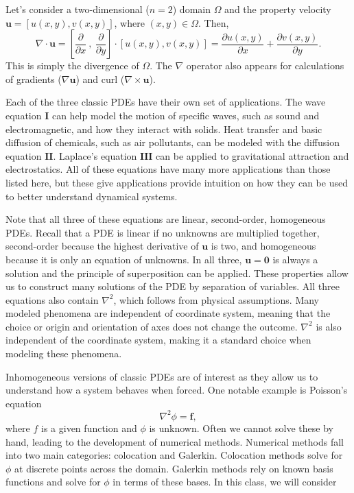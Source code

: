 \noindent Let's consider a two-dimensional ($n = 2$) domain $\Omega$ and the property velocity $\mathbf{u} = \left[u(x,y), v(x,y) \right]$, where $(x,y) \in \Omega$. Then,
$$
\nabla \cdot \mathbf{u}= \left[ 
\frac{\partial }{\partial x} \ , \ \frac{\partial }{\partial y} \right] \cdot  \left[  u(x,y), v(x,y) \right]= 
\frac{\partial u(x,y) }{\partial x} + \frac{\partial v(x,y)}{\partial y}.
$$
This is simply the divergence of $\Omega$. The $\nabla$ operator also appears for calculations of gradients ($\nabla \mathbf{u}$) and curl ($\nabla \times \mathbf{u}$).

Each of the three classic PDEs have their own set of applications. The wave equation $\mathbf{I}$ can help model the motion of specific waves, such as sound and electromagnetic, and how they interact with solids. Heat transfer and basic diffusion of chemicals, such as air pollutants, can be modeled with the diffusion equation $\mathbf{II}$. Laplace's equation $\mathbf{III}$ can be applied to gravitational attraction and electrostatics. All of these equations have many more applications than those listed here, but these give applications provide intuition on how they can be used to better understand dynamical systems.

Note that all three of these equations are linear, second-order, homogeneous PDEs. Recall that a PDE is linear if no unknowns are multiplied together, second-order because the highest derivative of $\mathbf{u}$ is two, and homogeneous because it is only an equation of unknowns. In all three, $\mathbf{u} = \mathbf{0}$ is always a solution and the principle of superposition can be applied. These properties allow us to construct many solutions of the PDE by separation of variables. All three equations also contain $\nabla^2$, which follows from physical assumptions. Many modeled phenomena are independent of coordinate system, meaning that the choice or origin and orientation of axes does not change the outcome.  $\nabla^2$ is also independent of the coordinate system, making it a standard choice when modeling these phenomena.

Inhomogeneous versions of classic PDEs are of interest as they allow us to understand how a system behaves when forced. One notable example is Poisson's equation
$$
\nabla^2 \phi = \mathbf{f},
$$
where $f$ is a given function and $\phi$ is unknown. Often we cannot solve these by hand, leading to the development of numerical methods. Numerical methods fall into two main categories: colocation and Galerkin. Colocation methods solve for $\phi$ at discrete points across the domain. Galerkin methods rely on known basis functions and solve for $\phi$ in terms of these bases. In this class, we will consider

